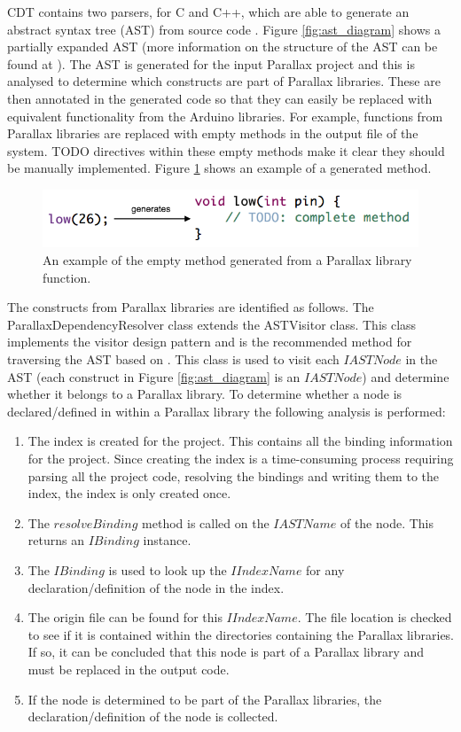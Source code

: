 \documentclass{UoYCSproject}
\begin{document}
CDT contains two parsers, for C and C++, which are able to generate an abstract syntax tree (AST) from source code \parencite{cdt_parsing}. Figure \ref{fig:ast_diagram} shows a partially expanded AST (more information on the structure of the AST can be found at \parencite{ast_structure}). The AST is generated for the input Parallax project and this is analysed to determine which constructs are part of Parallax libraries. These are then annotated in the generated code so that they can easily be replaced with equivalent functionality from the Arduino libraries. For example, functions from Parallax libraries are replaced with empty methods in the output file of the system. TODO directives within these empty methods make it clear they should be manually implemented. Figure \ref{fig:gen_stub} shows an example of a generated method.

\begin{figure}[h!]
  \centering
  \includegraphics[width=0.8\linewidth]{graphics/generated_method_stub.png}
  \caption{An example of the empty method generated from a Parallax library function.}
  \label{fig:gen_stub}
\end{figure}

The constructs from Parallax libraries are identified as follows. The ParallaxDependencyResolver class extends the ASTVisitor class. This class implements the visitor design pattern and is the recommended method for traversing the AST based on \parencite{cdt_parsing}. This class is used to visit each $IASTNode$ in the AST (each construct in Figure \ref{fig:ast_diagram} is an $IASTNode$) and determine whether it belongs to a Parallax library. To determine whether a node  is declared/defined in within a Parallax library the following analysis is performed:
\begin{enumerate}
\item The index is created for the project. This contains all the binding information for the project. Since creating the index is a time-consuming process requiring parsing all the project code, resolving the bindings and writing them to the index, the index is only created once.
\item The $resolveBinding$ method is called on the $IASTName$ of the node. This returns an $IBinding$ instance.
\item The $IBinding$ is used to look up the $IIndexName$ for any declaration/definition of the node in the index.
\item The origin file can be found for this $IIndexName$. The file location is checked to see if it is contained within the directories containing the Parallax libraries. If so, it can be concluded that this node is part of a Parallax library and must be replaced in the output code.
\item If the node is determined to be part of the Parallax libraries, the declaration/definition of the node is collected.
\end{enumerate}
\end{document}
